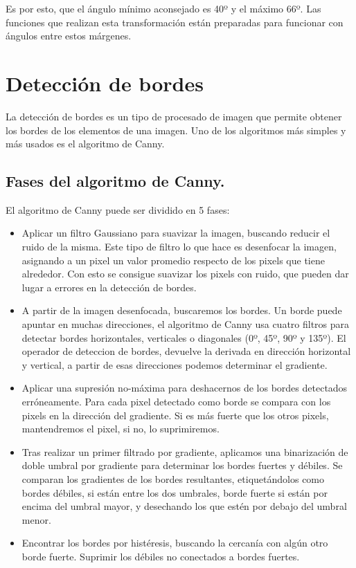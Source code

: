 Es por esto, que el ángulo mínimo aconsejado es 40º y el máximo 66º. Las funciones que realizan esta transformación están preparadas para funcionar con ángulos entre estos márgenes.


\section{Detección de bordes}
La detección de bordes es un tipo de procesado de imagen que permite obtener los bordes de los elementos de una imagen. Uno de los algoritmos más simples y más usados es el algoritmo de Canny\cite{canny_edge}. 

\subsection{Fases del algoritmo de Canny.}

El algoritmo de Canny puede ser dividido en 5 fases:
\begin{itemize}

	\item Aplicar un filtro Gaussiano para suavizar la imagen, buscando reducir el ruido de la misma. Este tipo de filtro lo que hace es desenfocar la imagen, asignando a un pixel un valor promedio respecto de los pixels que tiene alrededor. Con esto se consigue suavizar los pixels con ruido, que pueden dar lugar a errores en la detección de bordes.
	
	\item A partir de la imagen desenfocada, buscaremos los bordes. Un borde puede apuntar en muchas direcciones, el algoritmo de Canny usa cuatro filtros para detectar bordes horizontales, verticales o diagonales (0º, 45º, 90º y 135º). El operador de deteccion de bordes, devuelve la derivada en dirección horizontal y vertical, a partir de esas direcciones podemos determinar el gradiente.
	
	\item Aplicar una supresión no-máxima para deshacernos de los bordes detectados erróneamente. Para cada pixel detectado como borde se compara con los pixels en la dirección del gradiente. Si es más fuerte que los otros pixels, mantendremos el pixel, si no, lo suprimiremos.
	
	\item Tras realizar un primer filtrado por gradiente, aplicamos una binarización de doble umbral por gradiente para determinar los bordes fuertes y débiles. Se comparan los gradientes de los bordes resultantes, etiquetándolos como bordes débiles, si están entre los dos umbrales, borde fuerte si están por encima del umbral mayor, y desechando los que estén por debajo del umbral menor.
	
	\item Encontrar los bordes por histéresis, buscando  la cercanía con algún otro borde fuerte. Suprimir los débiles no conectados a bordes fuertes.
	
\end{itemize}

